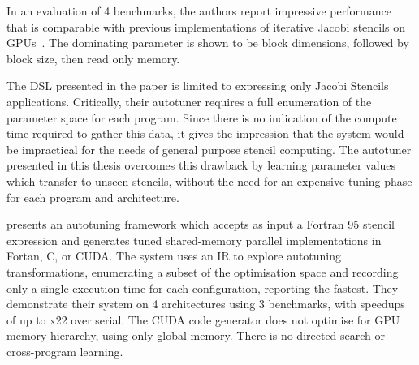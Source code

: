 In an evaluation of 4 benchmarks, the authors report impressive
performance that is comparable with previous implementations of
iterative Jacobi stencils on
GPUs~\cite{Holewinski2012,Phillips2010}. The dominating parameter is
shown to be block dimensions, followed by block size, then read only
memory.

%

The DSL presented in the paper is limited to expressing only Jacobi
Stencils applications. Critically, their autotuner requires a full
enumeration of the parameter space for each program. Since there is no
indication of the compute time required to gather this data, it gives
the impression that the system would be impractical for the needs of
general purpose stencil computing. The autotuner presented in this
thesis overcomes this drawback by learning parameter values which
transfer to unseen stencils, without the need for an expensive tuning
phase for each program and architecture.


\citeauthor{Kamil2010} presents an autotuning framework which accepts
as input a Fortran 95 stencil expression and generates tuned
shared-memory parallel implementations in Fortan, C, or CUDA. The
system uses an IR to explore autotuning transformations, enumerating a
subset of the optimisation space and recording only a single execution
time for each configuration, reporting the fastest. They demonstrate
their system on 4 architectures using 3 benchmarks, with speedups of
up to x22 over serial. The CUDA code generator does not optimise for
GPU memory hierarchy, using only global memory. There is no directed
search or cross-program learning.

